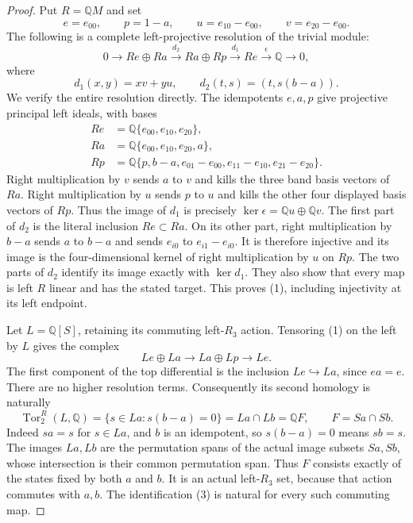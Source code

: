 \begin{proof}
Put $R=\mathbb QM$ and set
\[
 e=e_{00},\qquad p=1-a,\qquad
 u=e_{10}-e_{00},\qquad v=e_{20}-e_{00}.
\]
The following is a complete left-projective resolution of the
trivial module:
\[
 0\longrightarrow Re\oplus Ra
 \xrightarrow{d_2}Ra\oplus Rp
 \xrightarrow{d_1}Re\xrightarrow{\epsilon}\mathbb Q
 \longrightarrow0,                                         \tag{1}
\]
where
\[
 d_1(x,y)=xv+yu,\qquad d_2(t,s)=(t,s(b-a)).                 \tag{2}
\]
We verify the entire resolution directly.
The idempotents $e,a,p$ give projective principal left ideals,
with bases
\[
\begin{aligned}
 Re&=\mathbb Q\{e_{00},e_{10},e_{20}\},\\
 Ra&=\mathbb Q\{e_{00},e_{10},e_{20},a\},\\
 Rp&=\mathbb Q\{p,b-a,e_{01}-e_{00},e_{11}-e_{10},
                                     e_{21}-e_{20}\}.
\end{aligned}
\]
Right multiplication by $v$ sends $a$ to $v$ and kills the
three band basis vectors of $Ra$.
Right multiplication by $u$ sends $p$ to $u$ and kills
the other four displayed basis vectors of $Rp$.
Thus the image of $d_1$ is precisely
$\ker\epsilon=\mathbb Qu\oplus\mathbb Qv$.
The first part of $d_2$ is the literal inclusion $Re\subset Ra$.
On its other part, right multiplication by $b-a$ sends
$a$ to $b-a$ and sends $e_{i0}$ to $e_{i1}-e_{i0}$.
It is therefore injective and its image is the four-dimensional
kernel of right multiplication by $u$ on $Rp$.
The two parts of $d_2$ identify its image exactly with
$\ker d_1$.  They also show that every map is left $R$ linear
and has the stated target.  This proves (1), including
injectivity at its left endpoint.

Let $L=\mathbb Q[S]$, retaining its commuting left-$R_3$ action.
Tensoring (1) on the left by $L$ gives the complex
\[
 Le\oplus La\longrightarrow La\oplus Lp\longrightarrow Le.
\]
The first component of the top differential is the inclusion
$Le\hookrightarrow La$, since $ea=e$.
There are no higher resolution terms.  Consequently its second
homology is naturally
\[
 \operatorname{Tor}^{R}_2(L,\mathbb Q)
 =\{s\in La:s(b-a)=0\}
 =La\cap Lb
 =\mathbb QF,\qquad F=Sa\cap Sb.                            \tag{3}
\]
Indeed $sa=s$ for $s\in La$, and $b$ is an idempotent,
so $s(b-a)=0$ means $sb=s$.  The images $La,Lb$ are the
permutation spans of the actual image subsets $Sa,Sb$,
whose intersection is their common permutation span.
Thus $F$ consists exactly of the states fixed by both $a$ and $b$.
It is an actual left-$R_3$ set, because that action commutes
with $a,b$.  The identification (3) is natural for every such
commuting map.


\end{proof}
